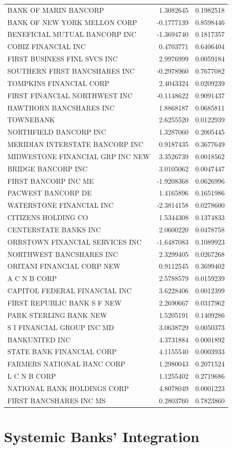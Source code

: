 \documentclass[11pt,]{article}
\begin{document}
\begin{longtable}[]{@{}lrr@{}}
BANK OF MARIN BANCORP & 1.3082645 & 0.1982518\tabularnewline
BANK OF NEW YORK MELLON CORP & -0.1777139 & 0.8598446\tabularnewline
BENEFICIAL MUTUAL BANCORP INC & -1.3694740 & 0.1817357\tabularnewline
COBIZ FINANCIAL INC & 0.4703771 & 0.6406404\tabularnewline
FIRST BUSINESS FINL SVCS INC & 2.9976999 & 0.0059184\tabularnewline
SOUTHERN FIRST BANCSHARES INC & -0.2978960 & 0.7677082\tabularnewline
TOMPKINS FINANCIAL CORP & 2.4043324 & 0.0209239\tabularnewline
FIRST FINANCIAL NORTHWEST INC & -0.1148622 & 0.9091437\tabularnewline
HAWTHORN BANCSHARES INC & 1.8868187 & 0.0685811\tabularnewline
TOWNEBANK & 2.6255520 & 0.0122939\tabularnewline
NORTHFIELD BANCORP INC & 1.3287060 & 0.2005445\tabularnewline
MERIDIAN INTERSTATE BANCORP INC & 0.9187435 & 0.3677649\tabularnewline
MIDWESTONE FINANCIAL GRP INC NEW & 3.3526739 & 0.0018562\tabularnewline
BRIDGE BANCORP INC & 3.0105062 & 0.0047447\tabularnewline
FIRST BANCORP INC ME & -1.9208368 & 0.0626996\tabularnewline
PACWEST BANCORP DE & 1.4165896 & 0.1651986\tabularnewline
WATERSTONE FINANCIAL INC & -2.3814158 & 0.0278600\tabularnewline
CITIZENS HOLDING CO & 1.5344308 & 0.1374833\tabularnewline
CENTERSTATE BANKS INC & 2.0600220 & 0.0478758\tabularnewline
ORRSTOWN FINANCIAL SERVICES INC & -1.6487083 & 0.1089923\tabularnewline
NORTHWEST BANCSHARES INC & 2.3299405 & 0.0267268\tabularnewline
ORITANI FINANCIAL CORP NEW & 0.9112545 & 0.3699402\tabularnewline
A C N B CORP & 2.5788579 & 0.0159239\tabularnewline
CAPITOL FEDERAL FINANCIAL INC & 3.6228406 & 0.0012399\tabularnewline
FIRST REPUBLIC BANK S F NEW & 2.2690667 & 0.0317962\tabularnewline
PARK STERLING BANK NEW & 1.5205191 & 0.1409286\tabularnewline
S I FINANCIAL GROUP INC MD & 3.0638729 & 0.0050373\tabularnewline
BANKUNITED INC & 4.3731884 & 0.0001892\tabularnewline
STATE BANK FINANCIAL CORP & 4.1155540 & 0.0003933\tabularnewline
FARMERS NATIONAL BANC CORP & 1.2980043 & 0.2071524\tabularnewline
L C N B CORP & 1.1255402 & 0.2719686\tabularnewline
NATIONAL BANK HOLDINGS CORP & 4.8078049 & 0.0001223\tabularnewline
FIRST BANCSHARES INC MS & 0.2803760 & 0.7823860\tabularnewline
\bottomrule
\end{longtable}

\section{Systemic Banks' Integration}\label{systemic-banks-integration}
\end{document}
